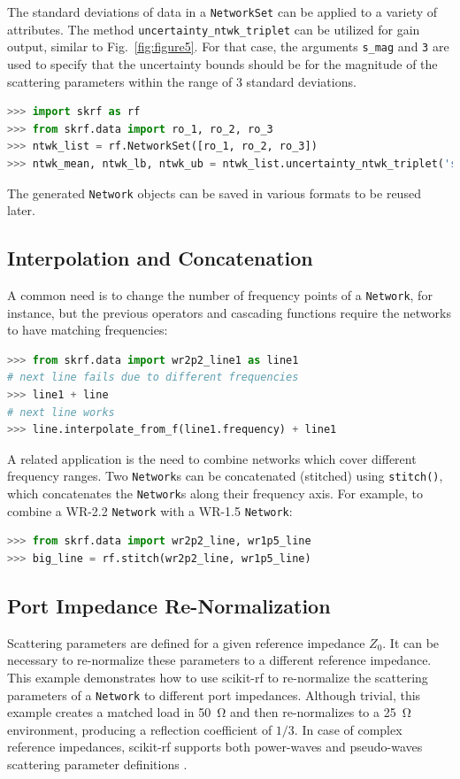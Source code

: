 \documentclass[journal, onecolumn]{IEEEtran}
\begin{document}
The standard deviations of data in a \texttt{NetworkSet} can be applied to a variety of attributes. The method \texttt{uncertainty\_ntwk\_triplet} can be utilized for gain output, similar to Fig.~\ref{fig:figure5}. For that case, the arguments \texttt{s\_mag} and \texttt{3} are used to specify that the uncertainty bounds should be for the magnitude of the scattering parameters within the range of 3 standard deviations.

\begin{lstlisting}[language=Python]
>>> import skrf as rf
>>> from skrf.data import ro_1, ro_2, ro_3
>>> ntwk_list = rf.NetworkSet([ro_1, ro_2, ro_3])
>>> ntwk_mean, ntwk_lb, ntwk_ub = ntwk_list.uncertainty_ntwk_triplet('s_mag', 3)
\end{lstlisting}

The generated \texttt{Network} objects can be saved in various formats to be reused later.

\subsection{Interpolation and Concatenation}
A common need is to change the number of frequency points of a \texttt{Network}, for instance, but the previous operators and cascading functions require the networks to have matching frequencies:

\begin{lstlisting}[language=Python]
>>> from skrf.data import wr2p2_line1 as line1
# next line fails due to different frequencies
>>> line1 + line 
# next line works
>>> line.interpolate_from_f(line1.frequency) + line1  
\end{lstlisting}

A related application is the need to combine networks which cover different frequency ranges. Two \texttt{Network}s can be concatenated (stitched) using \texttt{stitch()}, which concatenates the \texttt{Network}s along their frequency axis. For example, to combine a WR-2.2 \texttt{Network} with a WR-1.5 \texttt{Network}:

\begin{lstlisting}[language=Python]
>>> from skrf.data import wr2p2_line, wr1p5_line
>>> big_line = rf.stitch(wr2p2_line, wr1p5_line)
\end{lstlisting}

\subsection{Port Impedance Re-Normalization}
Scattering parameters are defined for a given reference impedance $Z_0$. It can be necessary to re-normalize these parameters to a different reference impedance. This example demonstrates how to use scikit-rf to re-normalize the  scattering parameters of a \texttt{Network} to different port impedances. Although trivial, this example creates a matched load in \SI{50}{\ohm} and then re-normalizes to a \SI{25}{\ohm} environment, producing a reflection coefficient of $1/3$. In case of complex reference impedances, scikit-rf supports both power-waves and pseudo-waves scattering parameter definitions \cite{williams2013}.
\end{document}
